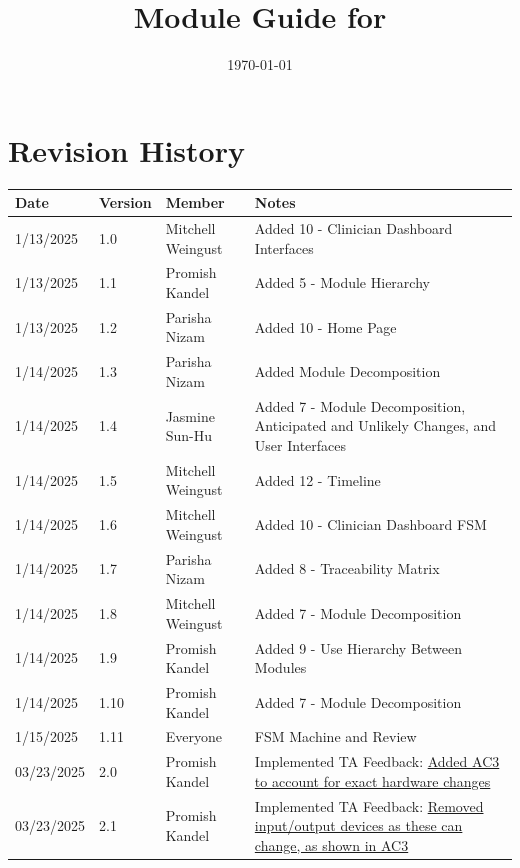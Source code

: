 \documentclass[12pt, titlepage]{article}
\begin{document}
\title{Module Guide for \progname{}} 
\author{\authname}
\date{\today}

\maketitle


\section{Revision History}

\begin{tabularx}{\textwidth}{p{3cm}p{2cm}p{3cm}X}
  \toprule {\bf Date} & {\bf Version} & {\bf Member} & {\bf Notes}\\
  \midrule
  1/13/2025 & 1.0 & Mitchell Weingust & Added 10 - Clinician Dashboard Interfaces\\
  1/13/2025 & 1.1 & Promish Kandel & Added 5 - Module Hierarchy\\
  1/13/2025 & 1.2 & Parisha Nizam & Added 10 - Home Page \\
  1/14/2025 & 1.3 & Parisha Nizam & Added Module Decomposition\\
  1/14/2025 & 1.4 & Jasmine Sun-Hu & Added 7 - Module Decomposition, Anticipated and Unlikely Changes, and User Interfaces\\
  1/14/2025 & 1.5 & Mitchell Weingust & Added 12 - Timeline\\
  1/14/2025 & 1.6 & Mitchell Weingust & Added 10 - Clinician Dashboard FSM\\
  1/14/2025 & 1.7 & Parisha Nizam & Added 8 - Traceability Matrix\\
  1/14/2025 & 1.8 & Mitchell Weingust & Added 7 - Module Decomposition\\
  1/14/2025 & 1.9 & Promish Kandel & Added 9 - Use Hierarchy Between Modules\\
  1/14/2025 & 1.10 & Promish Kandel & Added 7 - Module Decomposition\\
  1/15/2025 & 1.11 & Everyone & FSM Machine and Review \\
  03/23/2025 & 2.0 & Promish Kandel & Implemented TA Feedback: \href{https://github.com/parishanizam/TeleHealth/issues/498}{Added AC3 to account for exact hardware changes}\\
  03/23/2025 & 2.1 & Promish Kandel & Implemented TA Feedback: \href{https://github.com/parishanizam/TeleHealth/issues/499}{Removed input/output devices as these can change, as shown in AC3}\\

\end{tabularx}
\end{document}
